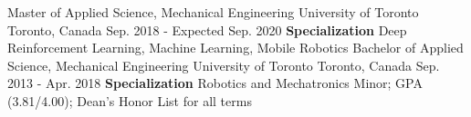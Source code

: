 \begin{cventries}
  \cventry
    {Master of Applied Science, Mechanical Engineering}
    {University of Toronto}
    {Toronto, Canada}
    {Sep. 2018 - Expected Sep. 2020}
    {\textbf{Specialization} Deep Reinforcement Learning, Machine Learning, Mobile Robotics}
  \cventry
    {Bachelor of Applied Science, Mechanical Engineering}
    {University of Toronto}
    {Toronto, Canada}
    {Sep. 2013 - Apr. 2018}
    {\textbf{Specialization} Robotics and Mechatronics Minor; GPA (3.81/4.00); Dean's Honor List for all terms}
\end{cventries}
